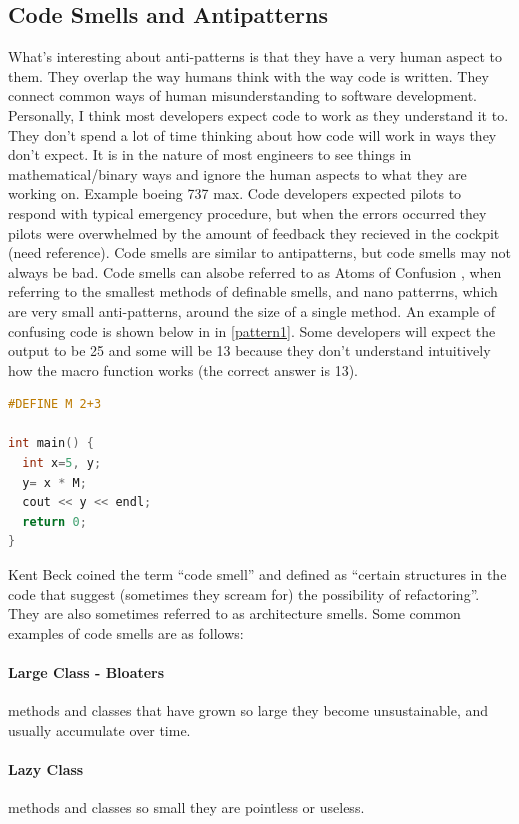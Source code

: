 \documentclass[conference]{IEEEtran}
\begin{document}
\subsection{Code Smells and Antipatterns}
What's interesting about anti-patterns is that they have a very human aspect to them. 
They overlap the way humans think with the way code is written. 
They connect common ways of human misunderstanding to software development. 
Personally, I think most developers expect code to work as they understand it to. 
They don't spend a lot of time thinking about how code will work in ways they don't expect.
It is in the nature of most engineers to see things in mathematical/binary ways and ignore the human aspects to what they are working on.
Example boeing 737 max.
Code developers expected pilots to respond with typical emergency procedure, but when the errors occurred they pilots were overwhelmed by the amount of feedback they recieved in the cockpit (need reference).
Code smells are similar to antipatterns, but code smells may not always be bad.
Code smells can alsobe referred to as Atoms of Confusion \cite{gopstein_understanding_2017}, when referring to the smallest methods of definable smells, and nano patterrns, which are very small anti-patterns, around the size of a single method. 
An example of confusing code is shown below in in \ref{pattern1}.
Some developers will expect the output to be 25 and some will be 13 because they don't understand intuitively how the macro function works (the correct answer is 13).

\begin{lstlisting}[language=C,frame=single,caption=Example Atom of Confusion,label=pattern1]
#DEFINE M 2+3

int main() {
  int x=5, y;
  y= x * M;
  cout << y << endl;
  return 0;
}
\end{lstlisting}

Kent Beck coined the term ``code smell'' \cite{fowler_refactoring:_2018} and defined as ``certain structures in the code that suggest (sometimes they scream for) the possibility of refactoring''. They are also sometimes referred to as architecture smells.
Some common examples of code smells are as follows:
\paragraph{Large Class - Bloaters} methods and classes that have grown so large they become unsustainable, and usually accumulate over time.
\paragraph{Lazy Class} methods and classes so small they are pointless or useless.
\end{document}
